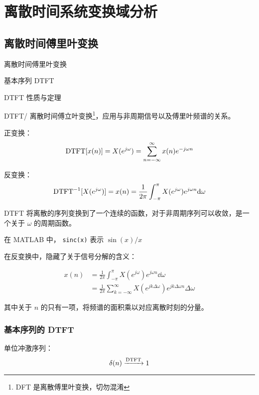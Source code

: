 \documentclass[cn,11pt,chinese,black,simple]{../elegantbook}
\begin{document}
\fi 
\def\chapname{week02}

\chapter{离散时间系统变换域分析}

\section{离散时间傅里叶变换}

\begin{introduction}
    \item 离散时间傅里叶变换
    \item 基本序列 DTFT
    \item DTFT 性质与定理
\end{introduction}

\begin{definition}[离散时间傅里叶变换]
    DTFT/ 离散时间傅立叶变换\footnote{DFT 是离散傅里叶变换，切勿混淆}，应用与非周期信号以及傅里叶频谱的关系。

    正变换：\[\text{DTFT}[x(n)] = X(e^{j \omega}) = \sum_{n=-\infty}^{\infty} x(n) e^{-j \omega n}\]

    反变换：\[\text{DTFT}^{-1}[X(e^{j \omega})] = x(n) = \frac{1}{2 \pi} \int_{-\pi}^{\pi} X(e^{j\omega})e^{j \omega n} \mathrm{d}\omega\]
\end{definition}

DTFT 将离散的序列变换到了一个连续的函数，对于非周期序列可以收敛，是一个关于 \(\omega\) 的周期函数。

在 MATLAB 中， \lstinline{sinc(x)} 表示 \(\sin(x)/x\)

在反变换中，隐藏了关于信号分解的含义：

\[\begin{aligned}
    x(n) &= \frac{1}{2 \pi} \int_{-\pi}^{\pi} X(e^{j \omega}) e^{j \omega n} \dd{\omega}\\
    &= \frac{1}{2 \pi} \sum_{k = -\infty}^{\infty} X(e^{j k \Delta \omega})e^{j k \Delta \omega n}\Delta \omega 
\end{aligned}\]

其中关于 \(n\) 的只有一项，将频谱的面积乘以对应离散时刻的分量。

\subsection{基本序列的 DTFT}

单位冲激序列：
\[\delta(n) \xrightarrow{\text{DTFT}} 1\]
\end{document}
